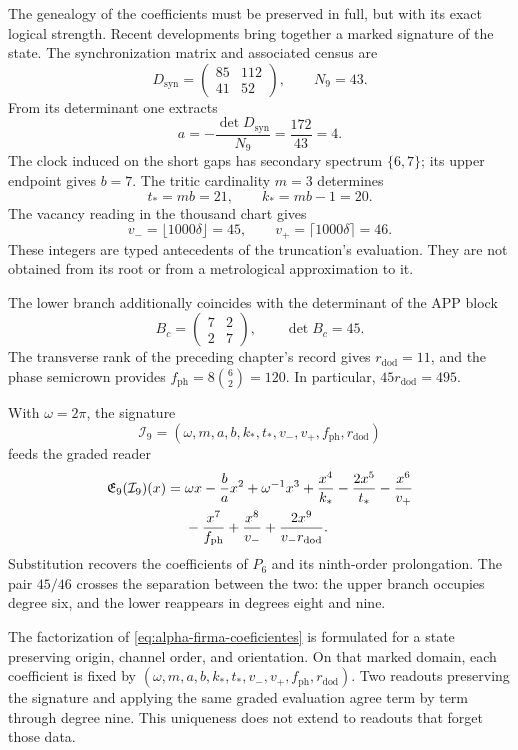 The genealogy of the coefficients must be preserved in full, but with its
exact logical strength. Recent developments bring together a marked signature
of the state. The synchronization matrix and associated census are
\[
 D_{\mathrm{syn}}=\begin{pmatrix}85&112\\41&52\end{pmatrix},
 \qquad N_9=43.
\]
From its determinant one extracts
\[
 a=-\frac{\det D_{\mathrm{syn}}}{N_9}
   =\frac{172}{43}=4.
\]
The clock induced on the short gaps has secondary spectrum
\(\{6,7\}\); its upper endpoint gives \(b=7\). The tritic cardinality
\(m=3\) determines
\[
 t_*=mb=21,\qquad k_*=mb-1=20.
\]
The vacancy reading in the thousand chart gives
\[
 v_-=\lfloor1000\delta\rfloor=45,\qquad
 v_+=\lceil1000\delta\rceil=46.
\]
These integers are typed antecedents of the truncation's evaluation. They are not
obtained from its root or from a metrological approximation to it.

The lower branch additionally coincides with the determinant of the APP block
\[
 B_c=\begin{pmatrix}7&2\\2&7\end{pmatrix},\qquad\det B_c=45.
\]
The transverse rank of the preceding chapter's record gives
\(r_{\mathrm{dod}}=11\), and the phase semicrown provides
\(f_{\mathrm{ph}}=8\binom62=120\). In particular,
\(45r_{\mathrm{dod}}=495\).

With \(\omega=2\pi\), the signature
\[
 \mathcal I_9=(\omega,m,a,b,k_*,t_*,v_-,v_+,f_{\mathrm{ph}},r_{\mathrm{dod}})
\]
feeds the graded reader
\begin{align}
 \mathfrak E_9(\mathcal I_9)(x)
 ={}&\omega x-\frac ba x^2+\omega^{-1}x^3
 +\frac{x^4}{k_*}-\frac{2x^5}{t_*}-\frac{x^6}{v_+}\notag\\
 &-\frac{x^7}{f_{\mathrm{ph}}}+\frac{x^8}{v_-}
 +\frac{2x^9}{v_-r_{\mathrm{dod}}}.
 \label{eq:alpha-firma-coeficientes}
\end{align}
Substitution recovers the coefficients of \(P_6\) and its
ninth-order prolongation. The pair \(45/46\) crosses the separation
between the two: the upper branch occupies degree six, and the lower reappears
in degrees eight and nine.

The factorization of \eqref{eq:alpha-firma-coeficientes} is formulated
for a state preserving origin, channel order, and orientation.
On that marked domain, each coefficient is fixed by
\((\omega,m,a,b,k_*,t_*,v_-,v_+,f_{\mathrm{ph}},r_{\mathrm{dod}})\).
Two readouts preserving the signature and applying the same graded
evaluation agree term by term through degree nine. This uniqueness
does not extend to readouts that forget those data.

